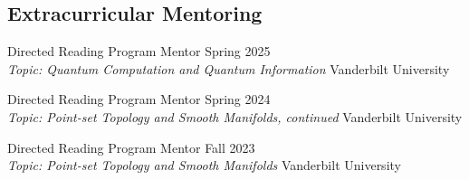 \documentclass[10pt,a4paper]{article}
\renewenvironment{itemize}{
  \begin{list}{}{
      \setlength{\leftmargin}{1.5em}
      \setlength{\itemsep}{0.25em}
      \setlength{\parskip}{0pt}
      \setlength{\parsep}{0.25em}
    }
}{
  \end{list}
}
\begin{document}
\begin{itemize}
		\subsection*{Extracurricular Mentoring}
        \item Directed Reading Program Mentor \hfill Spring 2025 \\
		\textit{Topic: Quantum Computation and Quantum Information} \hfill Vanderbilt University
        
		\item Directed Reading Program Mentor \hfill Spring 2024 \\
		\textit{Topic: Point-set Topology and Smooth Manifolds, continued} \hfill Vanderbilt University

		\item Directed Reading Program Mentor \hfill Fall 2023 \\
		\textit{Topic: Point-set Topology and Smooth Manifolds} \hfill Vanderbilt University
\end{itemize}
\fi
\end{document}
